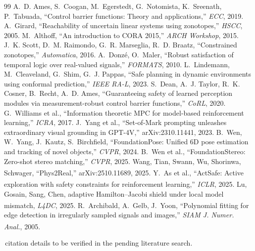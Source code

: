 \documentclass[10pt,twocolumn,letterpaper]{article}
\newcommand{\tv}{\textsuperscript{\dag}}  %
\begin{document}
{\footnotesize
\begin{thebibliography}{99}\setlength{\itemsep}{0pt}
 A.~D. Ames, S.~Coogan, M.~Egerstedt, G.~Notomista, K.~Sreenath, P.~Tabuada, ``Control barrier functions: Theory and applications,'' \emph{ECC}, 2019.
 A.~Girard, ``Reachability of uncertain linear systems using zonotopes,'' \emph{HSCC}, 2005.
 M.~Althoff, ``An introduction to CORA 2015,'' \emph{ARCH Workshop}, 2015.
 J.~K. Scott, D.~M. Raimondo, G.~R. Marseglia, R.~D. Braatz, ``Constrained zonotopes,'' \emph{Automatica}, 2016.
 A.~Donz\'e, O.~Maler, ``Robust satisfaction of temporal logic over real-valued signals,'' \emph{FORMATS}, 2010.
 L.~Lindemann, M.~Cleaveland, G.~Shim, G.~J. Pappas, ``Safe planning in dynamic environments using conformal prediction,'' \emph{IEEE RA-L}, 2023.
 S.~Dean, A.~J. Taylor, R.~K. Cosner, B.~Recht, A.~D. Ames, ``Guaranteeing safety of learned perception modules via measurement-robust control barrier functions,'' \emph{CoRL}, 2020.
 G.~Williams et al., ``Information theoretic MPC for model-based reinforcement learning,'' \emph{ICRA}, 2017.
 J.~Yang et al., ``Set-of-Mark prompting unleashes extraordinary visual grounding in GPT-4V,'' arXiv:2310.11441, 2023.
 B.~Wen, W.~Yang, J.~Kautz, S.~Birchfield, ``FoundationPose: Unified 6D pose estimation and tracking of novel objects,'' \emph{CVPR}, 2024.
 B.~Wen et al., ``FoundationStereo: Zero-shot stereo matching,'' \emph{CVPR}, 2025.
 Wang, Tian, Swann, Wu, Shorinwa, Schwager, ``Phys2Real,'' arXiv:2510.11689, 2025.\tv
{} Y.~As et al., ``ActSafe: Active exploration with safety constraints for reinforcement learning,'' \emph{ICLR}, 2025.\tv
{} Lu, Gosain, Sang, Chen, adaptive Hamilton--Jacobi shield under local model mismatch, \emph{L4DC}, 2025.\tv
{} R.~Archibald, A.~Gelb, J.~Yoon, ``Polynomial fitting for edge detection in irregularly sampled signals and images,'' \emph{SIAM J. Numer. Anal.}, 2005.\tv
\end{thebibliography}
\vspace{-1mm}\noindent\dag\,citation details to be verified in the pending literature search.\par}
\end{document}
